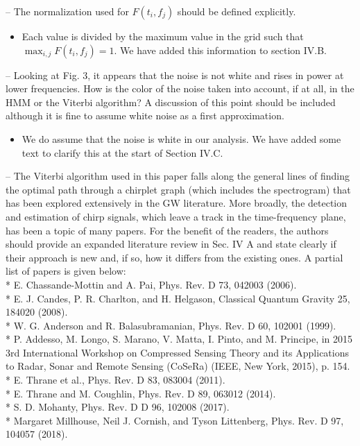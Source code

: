 \documentclass{article}
\begin{document}
\noindent
-- The normalization used for $F(t_i, f_j)$ should be defined explicitly. 
\begin{itemize}
\item Each value is divided by the maximum value in the grid such that $\max_{i,j} F(t_i, f_j) = 1$. We have added this information to section IV.B.
\end{itemize}

\noindent
-- Looking at Fig. 3, it appears that the noise is not white and rises in power at lower frequencies. How is the color of the noise taken into account, if at all, in the HMM or the Viterbi algorithm? A discussion of this point should be included although it is fine to assume white noise as a first approximation. 
\begin{itemize}
\item We do assume that the noise is white in our analysis. We have added some text to clarify this at the start of Section IV.C.
\end{itemize}

\noindent
-- The Viterbi algorithm used in this paper falls along the general lines of finding the optimal path through a chirplet graph (which includes the spectrogram) that has been explored extensively in the GW literature. More broadly, the detection and estimation of chirp signals, which leave a track in the time-frequency plane, has been a topic of many papers. For the benefit of the readers, the authors should provide an expanded literature review in Sec. IV A and state clearly if their approach is new and, if so, how it differs from the existing ones. A partial list of papers is given below: \\    
* E. Chassande-Mottin and A. Pai, Phys. Rev. D 73, 042003 (2006). \\
* E. J. Candes, P. R. Charlton, and H. Helgason, Classical Quantum Gravity 25, 184020 (2008).   \\
* W. G. Anderson and R. Balasubramanian, Phys. Rev. D 60, 102001 (1999).   \\
* P. Addesso, M. Longo, S. Marano, V. Matta, I. Pinto, and M. Principe, in 2015 3rd International Workshop on  Compressed Sensing Theory and its Applications to Radar, Sonar and Remote Sensing (CoSeRa) (IEEE, New York, 2015), p. 154.   \\
* E. Thrane et al., Phys. Rev. D 83, 083004 (2011).   \\
* E. Thrane and M. Coughlin, Phys. Rev. D 89, 063012 (2014).    \\
* S. D. Mohanty, Phys. Rev. D  D 96, 102008 (2017).   \\
* Margaret Millhouse, Neil J. Cornish, and Tyson Littenberg, Phys. Rev. D 97, 104057 (2018).\\
\end{document}
